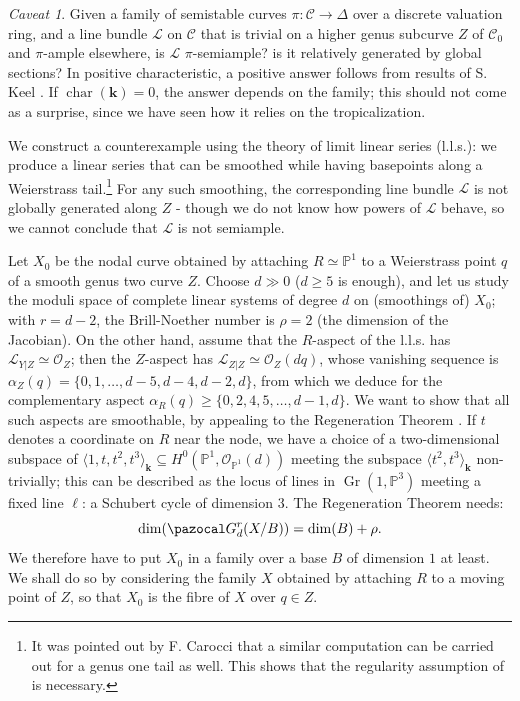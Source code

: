 \documentclass{compositio}
\newcommand{\PP}{\mathbb P}
\renewcommand{\k}{\mathbf k}
\newcommand{\OO}{\mathcal O}
\renewcommand{\to}{\rightarrow}
\newcommand{\dvr}{\Delta}
\theoremstyle{plain}
\theoremstyle{definition}
\theoremstyle{remark}
\newtheorem*{caveat}{Caveat}
\begin{document}
\begin{caveat} Given a family of semistable curves $\pi\colon\mathcal C\to\dvr$ over a discrete valuation ring, and a line bundle $\mathcal L$ on $\mathcal C$ that is trivial on a higher genus subcurve $Z$ of $\mathcal C_0$ and $\pi$-ample elsewhere, is $\mathcal L$ $\pi$-semiample? is it relatively generated by global sections? In positive characteristic, a positive answer follows from results of S. Keel \cite{Keel-bpf}. If $\operatorname{char}(\k)=0$, the answer depends on the family; this should not come as a surprise, since we have seen how it relies on the tropicalization.

We construct a counterexample using the theory of limit linear series (l.l.s.): we produce a linear series that can be smoothed while having basepoints along a Weierstrass tail.\footnote{It was pointed out by F. Carocci that a similar computation can be carried out for a genus one tail as well. This shows that the regularity assumption of \cite[Lemma 2.13]{SMY1} is necessary.} For any such smoothing, the corresponding line bundle $\mathcal L$ is not globally generated along $Z$ - though we do not know how powers of $\mathcal L$ behave, so we cannot conclude that $\mathcal L$ is not semiample.
 
 Let $X_0$ be the nodal curve obtained by attaching $R\simeq\PP^1$ to a Weierstrass point $q$ of a smooth genus two curve $Z$. Choose $d\gg 0$ ($d\geq5$ is enough), and let us study the moduli space of complete linear systems of degree $d$ on (smoothings of) $X_0$; with $r=d-2$, the Brill-Noether number is $\rho=2$ (the dimension of the Jacobian). On the other hand, assume that the $R$-aspect of the l.l.s. has $\mathcal L_{Y|Z}\simeq\OO_Z$; then the $Z$-aspect has $\mathcal L_{Z|Z}\simeq\OO_Z(dq)$, whose vanishing sequence is $\alpha_Z(q)=\{0,1,\ldots,d-5,d-4,d-2,d\}$, from which we deduce for the complementary aspect $\alpha_R(q)\geq\{0,2,4,5,\ldots,d-1,d\}$. We want to show that all such aspects are smoothable, by appealing to the Regeneration Theorem \cite[Theorem 5.41]{HM}. If $t$ denotes a coordinate on $R$ near the node, we have a choice of a two-dimensional subspace of $\langle 1,t,t^2,t^3\rangle_\k\subseteq H^0(\PP^1,\OO_{\PP^1}(d))$ meeting the subspace $\langle t^2,t^3\rangle_\k$ non-trivially; this can be described as the locus of lines in $\operatorname{Gr}(1,\PP^3)$ meeting a fixed line $\ell$: a Schubert cycle of dimension $3$. The Regeneration Theorem needs:
 \[\dim(\pazocal G^r_d(X/B))=\dim(B)+\rho.\]
 We therefore have to put $X_0$ in a family over a base $B$ of dimension $1$ at least.  We shall do so by considering the family $X$ obtained by attaching $R$ to a moving point of $Z$, so that $X_0$ is the fibre of $X$ over $q\in Z$.
 

\end{caveat}
\end{document}

